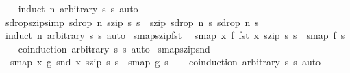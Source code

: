 \begin{isabellebody}
%
\isadelimproof
\ \ %
\endisadelimproof
%
\isatagproof
{}\isamarkupfalse%
\ {\isacharparenleft}induct\ n\ arbitrary{\isacharcolon}\ s{}\ s{}{\isacharparenright}\ auto%
\endisatagproof
{\isafoldproof}%
%
\isadelimproof
\isanewline
%
\endisadelimproof
\isanewline
{}\isamarkupfalse%
\ sdrop{\isacharunderscore}szip{\isacharbrackleft}simp{\isacharbrackright}{\isacharcolon}\ {\isachardoublequoteopen}sdrop\ n\ {\isacharparenleft}szip\ s{}\ s{}{\isacharparenright}\ {\isacharequal}\ szip\ {\isacharparenleft}sdrop\ n\ s{}{\isacharparenright}\ {\isacharparenleft}sdrop\ n\ s{}{\isacharparenright}{\isachardoublequoteclose}\isanewline
%
\isadelimproof
\ \ %
\endisadelimproof
%
\isatagproof
{}\isamarkupfalse%
\ {\isacharparenleft}induct\ n\ arbitrary{\isacharcolon}\ s{}\ s{}{\isacharparenright}\ auto%
\endisatagproof
{\isafoldproof}%
%
\isadelimproof
\isanewline
%
\endisadelimproof
\isanewline
{}\isamarkupfalse%
\ smap{\isacharunderscore}szip{\isacharunderscore}fst{\isacharcolon}\isanewline
\ \ {\isachardoublequoteopen}smap\ {\isacharparenleft}{\isasymlambda}x{\isachardot}\ f\ {\isacharparenleft}fst\ x{\isacharparenright}{\isacharparenright}\ {\isacharparenleft}szip\ s{}\ s{}{\isacharparenright}\ {\isacharequal}\ smap\ f\ s{}{\isachardoublequoteclose}\isanewline
%
\isadelimproof
\ \ %
\endisadelimproof
%
\isatagproof
{}\isamarkupfalse%
\ {\isacharparenleft}coinduction\ arbitrary{\isacharcolon}\ s{}\ s{}{\isacharparenright}\ auto%
\endisatagproof
{\isafoldproof}%
%
\isadelimproof
\isanewline
%
\endisadelimproof
\isanewline
{}\isamarkupfalse%
\ smap{\isacharunderscore}szip{\isacharunderscore}snd{\isacharcolon}\isanewline
\ \ {\isachardoublequoteopen}smap\ {\isacharparenleft}{\isasymlambda}x{\isachardot}\ g\ {\isacharparenleft}snd\ x{\isacharparenright}{\isacharparenright}\ {\isacharparenleft}szip\ s{}\ s{}{\isacharparenright}\ {\isacharequal}\ smap\ g\ s{}{\isachardoublequoteclose}\isanewline
%
\isadelimproof
\ \ %
\endisadelimproof
%
\isatagproof
{}\isamarkupfalse%
\ {\isacharparenleft}coinduction\ arbitrary{\isacharcolon}\ s{}\ s{}{\isacharparenright}\ auto%
\endisatagproof
{\isafoldproof}%
%
\isadelimproof
%
\endisadelimproof
%
\isadelimdocument
%
\endisadelimdocument
%
\isatagdocument
%
\isamarkuptrue%
%
\endisatagdocument

\end{isabellebody}
